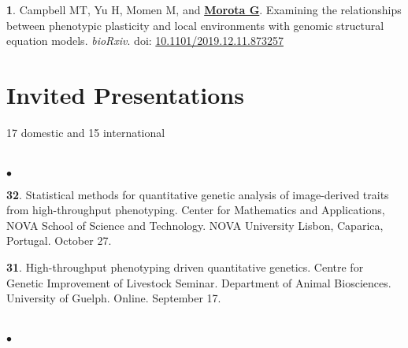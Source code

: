 \documentclass[margin,line,10pt]{res}
\newenvironment{list1}{
  \begin{list}{\ding{113}}{%
      \setlength{\itemsep}{0in}
      \setlength{\parsep}{0in} \setlength{\parskip}{0in}
      \setlength{\topsep}{0in} \setlength{\partopsep}{0in} 
      \setlength{\leftmargin}{0.17in}}}{\end{list}}
\newenvironment{list2}{
  \begin{list}{$\bullet$}{%
      \setlength{\itemsep}{0in}
      \setlength{\parsep}{0in} \setlength{\parskip}{0in}
      \setlength{\topsep}{0in} \setlength{\partopsep}{0in} 
      \setlength{\leftmargin}{0.2in}}}{\end{list}}
\begin{document}
\begin{resume}
\begin{list1}
  \vspace{0.5cm}

\item [{\bf 1}.] Campbell MT, Yu H, Momen M, and \textbf{\underline{Morota G}}. Examining the relationships between phenotypic plasticity and local environments with genomic structural equation models. \emph{bioRxiv}. doi: \textcolor{blue}{\href{https://doi.org/10.1101/2019.12.11.873257}{10.1101/2019.12.11.873257}}
  

\end{list1}




\vspace{1.0cm}
\section{\sc Invited Presentations}
\vspace{0.5cm}
17 domestic and 15 international \\
\noindent

\section{}
\begin{list2}

\item [{\bf 32}.] Statistical methods for quantitative genetic analysis of image-derived traits from high-throughput phenotyping. Center for Mathematics and Applications, NOVA School of Science and Technology. NOVA University Lisbon, Caparica, Portugal. October 27.

      \vspace{0.5cm}
  
 \item [{\bf 31}.] High-throughput phenotyping driven quantitative genetics. Centre for Genetic Improvement of Livestock Seminar. Department of Animal Biosciences. University of Guelph. Online. September 17.

\end{list2}

\section{}
\begin{list2}


\end{list2}
\end{resume}
\end{document}
